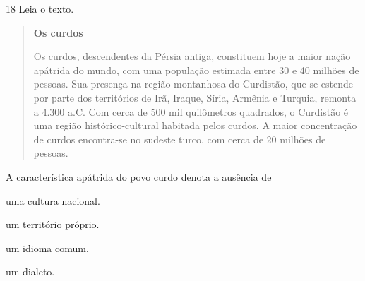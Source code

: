 \num{18} Leia o texto.

\begin{quote}
\textbf{Os curdos}

Os curdos, descendentes da Pérsia antiga, constituem hoje a maior nação apátrida do mundo, com uma população estimada entre 30 e 40 milhões de pessoas. Sua presença na região montanhosa do Curdistão, que se estende por parte dos territórios de Irã, Iraque, Síria, Armênia e Turquia, remonta a 4.300 a.C. Com cerca de 500 mil quilômetros quadrados, o Curdistão é uma região histórico-cultural habitada pelos curdos. A maior concentração de curdos encontra-se no sudeste turco, com cerca de 20 milhões de pessoas.

\end{quote}

A característica apátrida do povo curdo denota a ausência de

\begin{escolha}
\item  uma cultura nacional.

\item  um território próprio.

\item  um idioma comum.

\item  um dialeto.
\end{escolha}